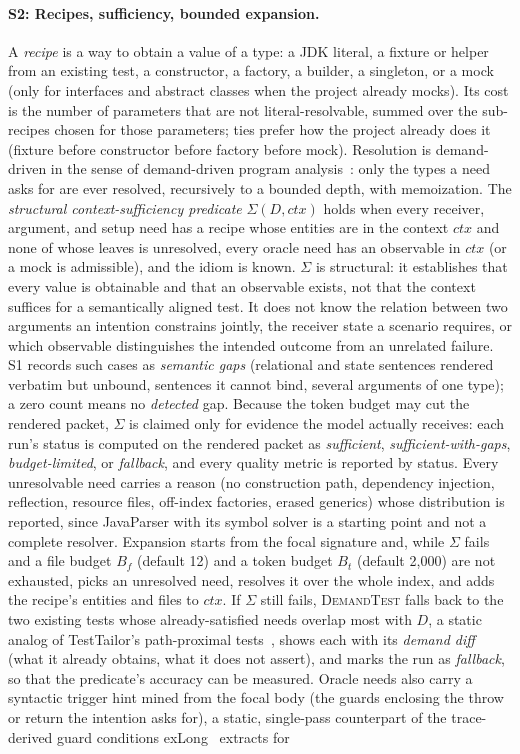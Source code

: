 \documentclass[sigconf,nonacm]{acmart}
\newcommand{\tool}{\textsc{DemandTest}\xspace}
\newcommand{\suff}{\ensuremath{\Sigma}\xspace}
\begin{document}
\paragraph{S2: Recipes, sufficiency, bounded expansion.}
A \emph{recipe} is a way to obtain a value of a type: a JDK literal, a fixture or helper from an existing test, a constructor, a factory, a builder, a singleton, or a mock (only for interfaces and abstract classes when the project already mocks). Its cost is the number of parameters that are not literal-resolvable, summed over the sub-recipes chosen for those parameters; ties prefer how the project already does it (fixture before constructor before factory before mock). Resolution is demand-driven in the sense of demand-driven program analysis~\cite{heintze2001demand}: only the types a need asks for are ever resolved, recursively to a bounded depth, with memoization. The \emph{structural context-sufficiency predicate} \suff$(D,\mathit{ctx})$ holds when every receiver, argument, and setup need has a recipe whose entities are in the context $\mathit{ctx}$ and none of whose leaves is unresolved, every oracle need has an observable in $\mathit{ctx}$ (or a mock is admissible), and the idiom is known. \suff is structural: it establishes that every value is obtainable and that an observable exists, not that the context suffices for a semantically aligned test. It does not know the relation between two arguments an intention constrains jointly, the receiver state a scenario requires, or which observable distinguishes the intended outcome from an unrelated failure. S1 records such cases as \emph{semantic gaps} (relational and state sentences rendered verbatim but unbound, sentences it cannot bind, several arguments of one type); a zero count means no \emph{detected} gap. Because the token budget may cut the rendered packet, \suff is claimed only for evidence the model actually receives: each run's status is computed on the rendered packet as \emph{sufficient}, \emph{sufficient-with-gaps}, \emph{budget-limited}, or \emph{fallback}, and every quality metric is reported by status. Every unresolvable need carries a reason (no construction path, dependency injection, reflection, resource files, off-index factories, erased generics) whose distribution is reported, since JavaParser with its symbol solver is a starting point and not a complete resolver. Expansion starts from the focal signature and, while \suff fails and a file budget $B_f$ (default 12) and a token budget $B_t$ (default 2{,}000) are not exhausted, picks an unresolved need, resolves it over the whole index, and adds the recipe's entities and files to $\mathit{ctx}$. If \suff still fails, \tool falls back to the two existing tests whose already-satisfied needs overlap most with $D$, a static analog of TestTailor's path-proximal tests~\cite{zhou2026testtailor}, shows each with its \emph{demand diff} (what it already obtains, what it does not assert), and marks the run as \emph{fallback}, so that the predicate's accuracy can be measured. Oracle needs also carry a syntactic trigger hint mined from the focal body (the guards enclosing the throw or return the intention asks for), a static, single-pass counterpart of the trace-derived guard conditions exLong~\cite{zhang2025exlong} extracts for 
\end{document}

